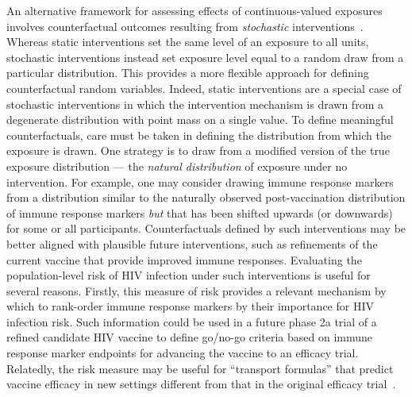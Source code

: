 An alternative framework for assessing effects of continuous-valued exposures
involves counterfactual outcomes resulting from \textit{stochastic}
interventions~\citep{diaz2012population, haneuse2013estimation}. Whereas static
interventions set the same level of an exposure to all units, stochastic
interventions instead set exposure level equal to a random draw from
a particular distribution. This provides a more flexible approach for defining
counterfactual random variables. Indeed, static interventions are a special case
of stochastic interventions in which the intervention mechanism is drawn from
a degenerate distribution with point mass on a single value. To define
meaningful counterfactuals, care must be taken in defining the distribution from
which the exposure is drawn. One strategy is to draw from a modified version of
the true exposure distribution --- the \textit{natural distribution} of exposure
under no intervention. For example, one may consider drawing immune response
markers from a distribution similar to the naturally observed post-vaccination
distribution of immune response markers \textit{but} that has been shifted
upwards (or downwards) for some or all participants. Counterfactuals defined by
such interventions may be better aligned with plausible future interventions,
such as refinements of the current vaccine that provide improved immune
responses. Evaluating the population-level risk of HIV infection under such
interventions is useful for several reasons. Firstly, this measure of risk
provides a relevant mechanism by which to rank-order immune response markers by
their importance for HIV infection risk. Such information could be used in
a future phase 2a trial of a refined candidate HIV vaccine to define  go/no-go
criteria based on immune response marker endpoints for advancing the vaccine to
an efficacy trial. Relatedly, the risk measure may be useful for ``transport
formulas'' that predict vaccine efficacy in new settings different from that in
the original efficacy trial~\citep{pearl2014external}.

